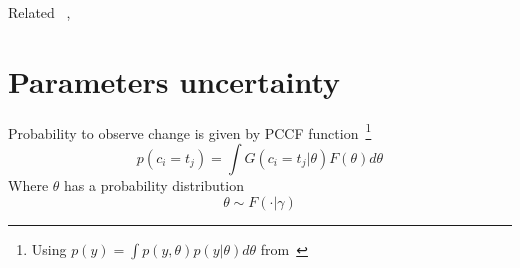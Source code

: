 Related ~\cite{Dries_AdaptiveDrift}, ~\cite{Gama_Kosina}

\section{Parameters uncertainty}
Probability to observe change is given by PCCF function~\footnote{Using $p(y)=\int p(y, \theta) p(y|\theta) d \theta$ from~\cite{gelman2013bayesian}}
\[ 
p(c_i = t_j) = \int  G(c_i = t_j | \theta) F(\theta) d \theta
\] 
Where $\theta$ has a probability distribution
\[ \theta \sim F( \cdot | \gamma) \]

%
%
%
%
%
%
